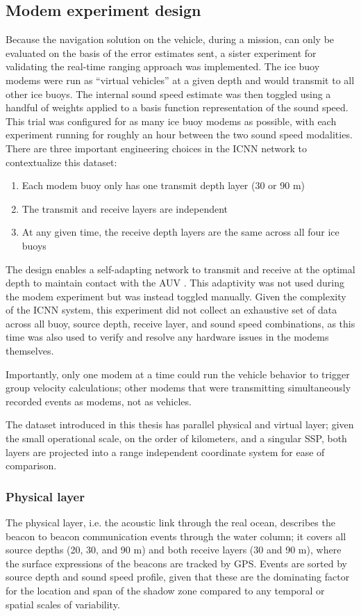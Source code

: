\subsection{Modem experiment design}

Because the navigation solution on the vehicle, during a mission, can only be evaluated on the basis of the error estimates sent, a sister experiment for validating the real-time ranging approach was implemented.
The ice buoy modems were run as ``virtual vehicles'' at a given depth and would transmit to all other ice buoys.
The internal sound speed estimate was then toggled using a handful of weights applied to a basis function representation of the sound speed.
This trial was configured for as many ice buoy modems as possible, with each experiment running for roughly an hour between the two sound speed modalities.
There are three important engineering choices in the ICNN network to contextualize this dataset:
\begin{enumerate}
\item Each modem buoy only has one transmit depth layer (30 or 90 m)
\item The transmit and receive layers are independent
\item At any given time, the receive depth layers are the same across all four ice buoys
\end{enumerate}

The design enables a self-adapting network to transmit and receive at the optimal depth to maintain contact with the AUV \citep{schneider_self-adapting_2020}.
This adaptivity was not used during the modem experiment but was instead toggled manually.
Given the complexity of the ICNN system, this experiment did not collect an exhaustive set of data across all buoy, source depth, receive layer, and sound speed combinations, as this time was also used to verify and resolve any hardware issues in the modems themselves.

Importantly, only one modem at a time could run the vehicle behavior to trigger group velocity calculations; other modems that were transmitting simultaneously recorded events as modems, not as vehicles.

The dataset introduced in this thesis has parallel physical and virtual layer; given the small operational scale, on the order of kilometers, and a singular SSP, both layers are projected into a range independent coordinate system for ease of comparison.

\subsubsection{Physical layer}
The physical layer, i.e. the acoustic link through the real ocean, describes the beacon to beacon communication events through the water column; it covers all source depths (20, 30, and 90 m) and both receive layers (30 and 90 m), where the surface expressions of the beacons are tracked by GPS. Events are sorted by source depth and sound speed profile, given that these are the dominating factor for the location and span of the shadow zone compared to any temporal or spatial scales of variability.


